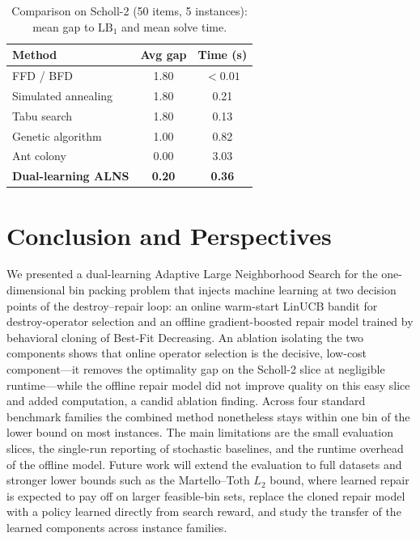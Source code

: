 \documentclass[conference]{IEEEtran}
\begin{document}
\begin{table}[htbp]
	\caption{Comparison on Scholl-2 (50 items, 5 instances): mean gap to $\mathrm{LB}_1$ and mean solve time.}
	\label{tab:compare}
	\centering
	\begin{tabular}{l c c}
		\hline
		\textbf{Method}             & \textbf{Avg gap} & \textbf{Time (s)} \\
		\hline
		FFD / BFD                   & 1.80             & $<0.01$           \\
		Simulated annealing         & 1.80             & 0.21              \\
		Tabu search                 & 1.80             & 0.13              \\
		Genetic algorithm           & 1.00             & 0.82              \\
		Ant colony                  & 0.00             & 3.03              \\
		\textbf{Dual-learning ALNS} & \textbf{0.20}    & \textbf{0.36}     \\
		\hline
	\end{tabular}
\end{table}

\section{Conclusion and Perspectives}\label{sec:conclusion}
We presented a dual-learning Adaptive Large Neighborhood Search for the
one-dimensional bin packing problem that injects machine learning at two decision
points of the destroy--repair loop: an online warm-start LinUCB bandit for
destroy-operator selection and an offline gradient-boosted repair model trained by
behavioral cloning of Best-Fit Decreasing. An ablation isolating the two
components shows that online operator selection is the decisive, low-cost
component---it removes the optimality gap on the Scholl-2 slice at negligible
runtime---while the offline repair model did not improve quality on this easy slice
and added computation, a candid ablation finding. Across four standard benchmark
families the combined method nonetheless stays within one bin of the lower bound on
most instances. The main limitations are the small evaluation slices, the
single-run reporting of stochastic baselines, and the runtime overhead of the
offline model. Future work will extend the evaluation to full datasets and stronger
lower bounds such as the Martello--Toth $L_2$ bound, where learned repair is
expected to pay off on larger feasible-bin sets, replace the cloned repair model
with a policy learned directly from search reward, and study the transfer of the
learned components across instance families.
\end{document}

